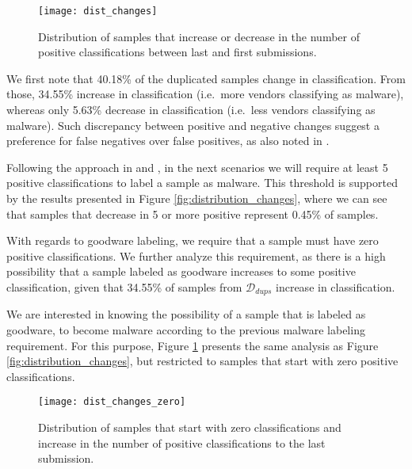 \begin{figure}[!h]
	\centering
	\texttt{[image: dist\_changes]}
	\caption{Distribution of samples that increase or decrease in the number of positive classifications between last and first submissions.}
\end{figure}

We first note that 40.18\% of the duplicated samples change in classification. From those, 34.55\% increase in classification (i.e.\ more vendors classifying as malware), whereas only 5.63\% decrease in classification (i.e.\ less vendors classifying as malware). Such discrepancy between positive and negative changes suggest a preference for false negatives over false positives, as also noted in \cite{miller:rev_int}.

Following the approach in \cite{miller:rev_int} and \cite{vsrndic2013detection}, in the next scenarios we will require at least 5 positive classifications to label a sample as malware. This threshold is supported by the results presented in Figure \ref{fig:distribution_changes}, where we can see that samples that decrease in 5 or more positive represent 0.45\% of samples.

With regards to goodware labeling, we require that a sample must have zero positive classifications. We further analyze this requirement, as there is a high possibility that a sample labeled as goodware increases to some positive classification, given that 34.55\% of samples from $\mathcal{D}_{dups}$ increase in classification.

We are interested in knowing the possibility of a sample that is labeled as goodware, to become malware according to the previous malware labeling requirement. For this purpose, Figure \ref{fig:distribution_changes_zero} presents the same analysis as Figure \ref{fig:distribution_changes}, but restricted to samples that start with zero positive classifications.


\begin{figure}[!h]
	\centering
	\texttt{[image: dist\_changes\_zero]}
	\caption{Distribution of samples that start with zero classifications and increase in the number of positive classifications to the last submission.}
	\label{fig:distribution_changes_zero}
\end{figure}

